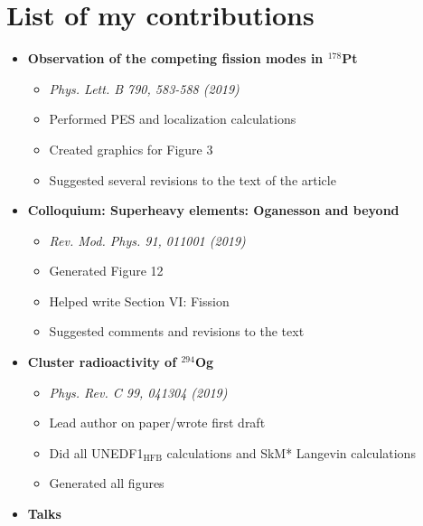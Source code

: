 \chapter{List of my contributions}\label{append:Contributions}

\begin{itemize}
	\item \textbf{Observation of the competing fission modes in $^{178}$Pt}
	\begin{itemize}
		\item \textit{Phys. Lett. B 790, 583-588 (2019)}
		\item Performed PES and localization calculations
		\item Created graphics for Figure 3
		\item Suggested several revisions to the text of the article
	\end{itemize}
	\item \textbf{Colloquium: Superheavy elements: Oganesson and beyond}
	\begin{itemize}
		\item \textit{Rev. Mod. Phys. 91, 011001 (2019)}
		\item Generated Figure 12
		\item Helped write Section VI: Fission
		\item Suggested comments and revisions to the text
	\end{itemize}
	\item \textbf{Cluster radioactivity of $^{294}$Og}
	\begin{itemize}
		\item \textit{Phys. Rev. C 99, 041304 (2019)}
		\item Lead author on paper/wrote first draft
		\item Did all UNEDF1$_{\mathrm{HFB}}$ calculations and SkM* Langevin calculations
		\item Generated all figures
	\end{itemize}
	\item \textbf{Talks}

\end{itemize}
